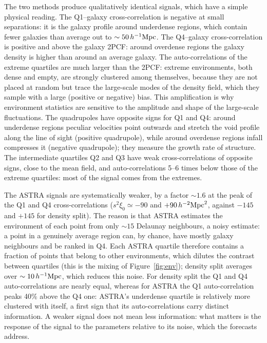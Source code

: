 The two methods produce qualitatively identical signals, which have a simple physical reading. The Q1--galaxy cross-correlation is negative at small separations: it is the galaxy profile around underdense regions, which contain fewer galaxies than average out to $\sim50\,h^{-1}\mathrm{Mpc}$. The Q4--galaxy cross-correlation is positive and above the galaxy 2PCF: around overdense regions the galaxy density is higher than around an average galaxy. The auto-correlations of the extreme quartiles are much larger than the 2PCF: extreme environments, both dense and empty, are strongly clustered among themselves, because they are not placed at random but trace the large-scale modes of the density field, which they sample with a large (positive or negative) bias. This amplification is why environment statistics are sensitive to the amplitude and shape of the large-scale fluctuations. The quadrupoles have opposite signs for Q1 and Q4: around underdense regions peculiar velocities point outwards and stretch the void profile along the line of sight (positive quadrupole), while around overdense regions infall compresses it (negative quadrupole); they measure the growth rate of structure. The intermediate quartiles Q2 and Q3 have weak cross-correlations of opposite signs, close to the mean field, and auto-correlations 5--6 times below those of the extreme quartiles: most of the signal comes from the extremes.

The ASTRA signals are systematically weaker, by a factor $\sim1.6$ at the peak of the Q1 and Q4 cross-correlations ($s^2\xi_0\simeq-90$ and $+90\,h^{-2}{\rm Mpc}^2$, against $-145$ and $+145$ for density split). The reason is that ASTRA estimates the environment of each point from only $\sim15$ Delaunay neighbours, a noisy estimate: a point in a genuinely average region can, by chance, have mostly galaxy neighbours and be ranked in Q4. Each ASTRA quartile therefore contains a fraction of points that belong to other environments, which dilutes the contrast between quartiles (this is the mixing of Figure~\ref{fig:env}); density split averages over $\sim10\,h^{-1}\mathrm{Mpc}$, which reduces this noise. For density split the Q1 and Q4 auto-correlations are nearly equal, whereas for ASTRA the Q1 auto-correlation peaks 40\% above the Q4 one: ASTRA's underdense quartile is relatively more clustered with itself, a first sign that its auto-correlations carry distinct information. A weaker signal does not mean less information: what matters is the response of the signal to the parameters relative to its noise, which the forecasts address.

